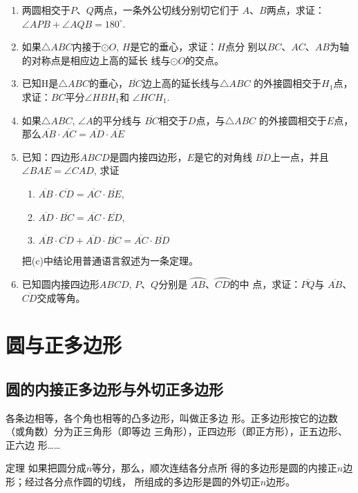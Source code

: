 \begin{enumerate}
  \item 两圆相交于$P$、$Q$两点，一条外公切线分别切它们于
  $A$、$B$两点，求证：$\angle APB+\angle AQB=180^{\circ}$.
  \item 如果$\triangle ABC$内接于$\odot O$, $H$是它的垂心，求证：$H$点分
  别以$BC$、$AC$、$AB$为轴的对称点是相应边上高的延长
  线与$\odot O$的交点。
  \item 已知H是$\triangle ABC$的垂心，$\overline{BC}$边上高的延长线与$\triangle ABC$
  的外接圆相交于$H_1$点，求证：$BC$平分$\angle HBH_1$和
  $\angle HCH_1$.
  \item 如果$\triangle ABC$, $\angle A$的平分线与
  $\overline{BC}$相交于$D$点，与$\triangle ABC$
  的外接圆相交于$E$点，那么$\overline{AB}\cdot \overline{AC}=\overline{AD}\cdot \overline{AE}$
  \item 已知：四边形$ABCD$是圆内接四边形，$E$是它的对角线
  $\overline{BD}$上一点，并且$\angle BAE=\angle CAD$, 求证
\begin{enumerate}
  \item $\overline{AB}\cdot \overline{CD}=\overline{AC}\cdot \overline{BE}$,
  \item $\overline{AD}\cdot \overline{BC}=\overline{AC}\cdot \overline{ED}$,
  \item $\overline{AB}\cdot \overline{CD}+\overline{AD}\cdot \overline{BC}=\overline{AC}\cdot \overline{BD}$
\end{enumerate}
  把(c)中结论用普通语言叙述为一条定理。

\item 已知圆内接四边形$ABCD$, $P$、$Q$分别是
$\wideparen{AB}$、$\wideparen{CD}$的中
点，求证：$\overline{PQ}$与
$\overline{AB}$、$\overline{CD}$交成等角。
\end{enumerate}


\section{圆与正多边形}
\subsection{圆的内接正多边形与外切正多边形}
各条边相等，各个角也相等的凸多边形，叫做正多边
形。正多边形按它的边数（或角数）分为正三角形（即等边
三角形），正四边形（即正方形），正五边形、正六边
形……

\begin{blk}
  {定理} 如果把圆分成$n$等分，那么，顺次连结各分点所
得的多边形是圆的内接正$n$边形；经过各分点作圆的切线，
所组成的多边形是圆的外切正$n$边形。
\end{blk}

